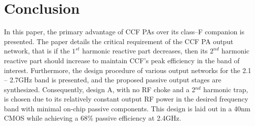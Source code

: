 \documentclass[conference]{IEEEtran}
\begin{document}


\section{Conclusion}
\label{section:Conclusion}
In this paper, the primary advantage of CCF PAs over its class--F companion is presented. The paper details the critical requirement of the CCF PA output network, that is if the $1^{st}$ harmonic reactive part decreases, then its $2^{nd}$ harmonic reactive part should increase to maintain CCF's peak efficiency in the band of interest. Furthermore, the design procedure of various output networks for the 2.1 -- 2.7GHz band is presented, and the proposed passive output stages are synthesized.  Consequently, design A, with no RF choke and a 2$^{nd}$ harmonic trap, is chosen due to its relatively constant output RF power in the desired frequency band with minimal on-chip passive components. This design is laid out in a 40nm CMOS while achieving a 68\% passive efficiency at 2.4GHz.



\end{document}
